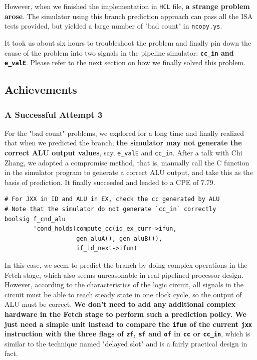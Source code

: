 \documentclass[12pt,a4paper]{article}
\begin{document}
However, when we finished the implementation in \texttt{HCL} file, \textbf{a strange problem arose}. The simulator using this branch prediction approach can pass all the ISA tests provided, but yielded a large number of "bad count" in \texttt{ncopy.ys}. 

It took us about six hours to troubleshoot the problem and finally pin down the cause of the problem into two signals in the pipeline simulator: \textbf{\texttt{cc\_in} and \texttt{e\_valE}}. Please refer to the next section on how we finally solved this problem.
\subsection{Achievements}
\subsubsection{A Successful Attempt 3}
For the "bad count" problems, we explored for a long time and finally realized that when we predicted the branch, \textbf{the simulator may not generate the correct ALU output values}, say, \texttt{e\_valE} and \texttt{cc\_in}. After a talk with Chi Zhang, we adopted a compromise method, that is, manually call the C function in the simulator program to generate a correct ALU output, and take this as the basis of prediction. It finally succeeded and leaded to a CPE of $7.79$.
\pagebreak
\begin{lstlisting}
# For JXX in ID and ALU in EX, check the cc generated by ALU
# Note that the simulator do not generate `cc_in` correctly
boolsig f_cnd_alu 
        'cond_holds(compute_cc(id_ex_curr->ifun, 
                    gen_aluA(), gen_aluB()), 
                    if_id_next->ifun)'
\end{lstlisting}

In this case, we seem to predict the branch by doing complex operations in the Fetch stage, which also seems unreasonable in real pipelined processor design. However, according to the characteristics of the logic circuit, all signals in the circuit must be able to reach steady state in one clock cycle, so the output of ALU must be correct. \textbf{We don't need to add any additional complex hardware in the Fetch stage to perform such a prediction policy. We just need a simple unit instead to compare the \texttt{ifun} of the current \texttt{jxx} instruction with the three flags of \texttt{zf}, \texttt{sf} and \texttt{of} in \texttt{cc} or \texttt{cc\_in}}, which is similar to the technique named "delayed slot" and is a fairly practical design in fact. 
\end{document}
